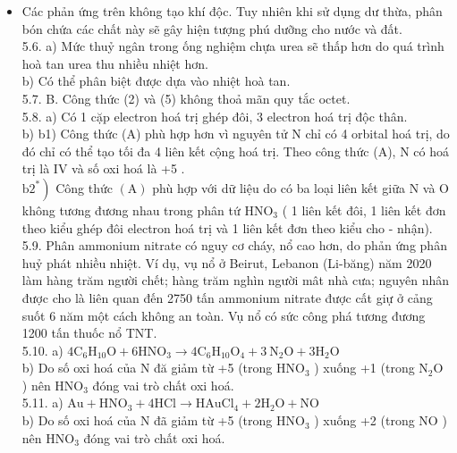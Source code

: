 \documentclass[10pt]{article}
\begin{document}
\begin{itemize}
  \item Các phản ứng trên không tạo khí độc. Tuy nhiên khi sử dụng dư thừa, phân bón chứa các chất này sẽ gây hiện tượng phú dưỡng cho nước và đất.\\
5.6. a) Mức thuỷ ngân trong ống nghiệm chựa urea sẽ thấp hơn do quá trình hoà tan urea thu nhiều nhiệt hơn.\\
b) Có thể phân biệt được dựa vào nhiệt hoà tan.\\
5.7. B. Công thức (2) và (5) không thoả mãn quy tắc octet.\\
5.8. a) Có 1 cặp electron hoá trị ghép đôi, 3 electron hoá trị độc thân.\\
b) b1) Công thức (A) phù hợp hơn vì nguyên tử N chỉ có 4 orbital hoá trị, do đó chỉ có thể tạo tối đa 4 liên kết cộng hoá trị. Theo công thức (A), N có hoá trị là IV và số oxi hoá là +5 .\\
$\left.\mathrm{b} 2^{*}\right)$ Công thức $(\mathrm{A})$ phù hợp với dữ liệu do có ba loại liên kết giữa N và O không tương đương nhau trong phân tứ $\mathrm{HNO}_{3}$ ( 1 liên kết đôi, 1 liên kết đơn theo kiểu ghép đôi electron hoá trị và 1 liên kết đơn theo kiểu cho - nhận).\\
5.9. Phân ammonium nitrate có nguy cơ cháy, nổ cao hơn, do phản ứng phân huỷ phát nhiều nhiệt. Ví dụ, vụ nổ ở Beirut, Lebanon (Li-băng) năm 2020 làm hàng trăm người chết; hàng trăm nghìn người mât nhà cưa; nguyên nhân được cho là liên quan đến 2750 tấn ammonium nitrate được cất giự ở cảng suốt 6 năm một cách không an toàn. Vụ nổ có sức công phá tương đương 1200 tấn thuốc nổ TNT.\\
5.10. a) $4 \mathrm{C}_{6} \mathrm{H}_{10} \mathrm{O}+6 \mathrm{HNO}_{3} \rightarrow 4 \mathrm{C}_{6} \mathrm{H}_{10} \mathrm{O}_{4}+3 \mathrm{~N}_{2} \mathrm{O}+3 \mathrm{H}_{2} \mathrm{O}$\\
b) Do số oxi hoá của N đă giảm từ +5 (trong $\mathrm{HNO}_{3}$ ) xuống +1 (trong $\mathrm{N}_{2} \mathrm{O}$ ) nên $\mathrm{HNO}_{3}$ đóng vai trò chất oxi hoá.\\
5.11. a) $\mathrm{Au}+\mathrm{HNO}_{3}+4 \mathrm{HCl} \rightarrow \mathrm{HAuCl}_{4}+2 \mathrm{H}_{2} \mathrm{O}+\mathrm{NO}$\\
b) Do số oxi hoá của N đã giảm từ +5 (trong $\mathrm{HNO}_{3}$ ) xuống +2 (trong NO ) nên $\mathrm{HNO}_{3}$ đóng vai trò chất oxi hoá.
\end{itemize}
\end{document}
